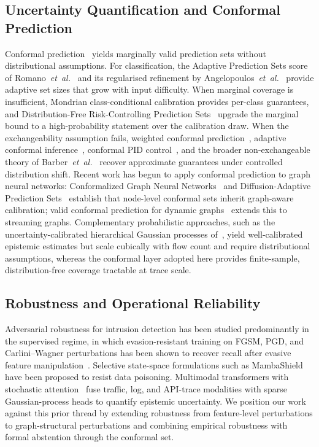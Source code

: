 \documentclass[journal,twoside]{IEEEtran}
\begin{document}
\subsection{Uncertainty Quantification and Conformal Prediction}
Conformal prediction~\cite{vovk2022alrw,shafer2008tutorial,angelopoulos2023gentle}
yields marginally valid prediction sets without distributional assumptions.
For classification, the Adaptive Prediction Sets score of
Romano~\emph{et~al.}~\cite{romano2020aps} and its regularised refinement by
Angelopoulos~\emph{et~al.}~\cite{angelopoulos2021raps} provide adaptive set
sizes that grow with input difficulty. When marginal coverage is insufficient,
Mondrian class-conditional calibration provides per-class guarantees, and
Distribution-Free Risk-Controlling Prediction
Sets~\cite{bates2021rcps,angelopoulos2025ltt,angelopoulos2024crc} upgrade
the marginal bound to a high-probability statement over the calibration
draw. When the exchangeability assumption fails, weighted
conformal prediction~\cite{tibshirani2019wcp}, adaptive conformal
inference~\cite{gibbs2021aci}, conformal PID
control~\cite{angelopoulos2024pid}, and the broader non-exchangeable theory
of Barber~\emph{et~al.}~\cite{barber2023nonexch} recover approximate
guarantees under controlled distribution shift. Recent work has begun to
apply conformal prediction to graph neural networks: Conformalized Graph
Neural Networks~\cite{huang2023cfgnn} and Diffusion-Adaptive Prediction
Sets~\cite{zargarbashi2023daps} establish that node-level conformal sets
inherit graph-aware calibration; valid conformal prediction for dynamic
graphs~\cite{davis2025dyncp} extends this to streaming graphs.
Complementary probabilistic approaches, such as the uncertainty-calibrated
hierarchical Gaussian processes of~\cite{anaedevha2026hgp}, yield
well-calibrated epistemic estimates but scale cubically with flow count
and require distributional assumptions, whereas the conformal layer
adopted here provides finite-sample, distribution-free coverage tractable
at trace scale.

\subsection{Robustness and Operational Reliability}
Adversarial robustness for intrusion detection has been studied
predominantly in the supervised regime, in which evasion-resistant training
on FGSM, PGD, and Carlini--Wagner perturbations has been shown to recover
recall after evasive feature
manipulation~\cite{anaedevha2024robustadv}. Selective state-space
formulations such as MambaShield~\cite{anaedevha2025mambashield} have been
proposed to resist data poisoning. Multimodal transformers with stochastic
attention~\cite{anaedevha2025stochmm} fuse traffic, log, and API-trace
modalities with sparse Gaussian-process heads to quantify epistemic
uncertainty. We position our work against this prior thread by extending
robustness from feature-level perturbations to graph-structural
perturbations and combining empirical robustness with formal abstention
through the conformal set.
\end{document}
